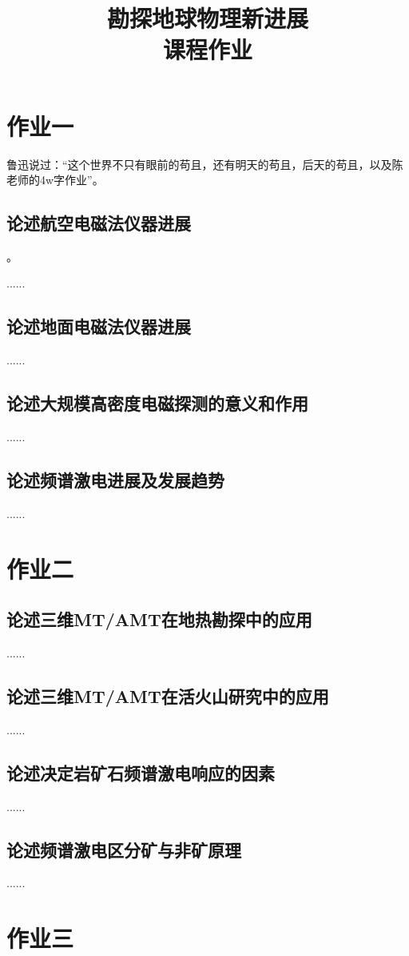 \documentclass{coursework}
\title{勘探地球物理新进展\\课程作业}%
\begin{document}
	\maketitle	
	\section{作业一}
	鲁迅说过：“这个世界不只有眼前的苟且，还有明天的苟且，后天的苟且，以及陈老师的4w字作业”\citep{luxun}。
	\subsection{论述航空电磁法仪器进展}
	\citep{Fountain1998,AUKEN201747}。
	
	......
	\subsection{论述地面电磁法仪器进展}
	......
	\subsection{论述大规模高密度电磁探测的意义和作用}
	......
	\subsection{论述频谱激电进展及发展趋势}
	......
	
	\section{作业二}
	\subsection{论述三维MT/AMT在地热勘探中的应用}
	......	
	\subsection{论述三维MT/AMT在活火山研究中的应用}
	......	
	\subsection{论述决定岩矿石频谱激电响应的因素}
	......	
	\subsection{论述频谱激电区分矿与非矿原理}
	......	

	\section{作业三}
\end{document}
